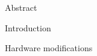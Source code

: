 

\usepackage{antropy_en}


  \anttitle

  \begin{topchapter}{Abstract}
    
  \end{topchapter}

  \begin{topchapter}{Introduction}
    
  \end{topchapter}

  \begin{topchapter}{Hardware modifications}
    
  \end{topchapter}

